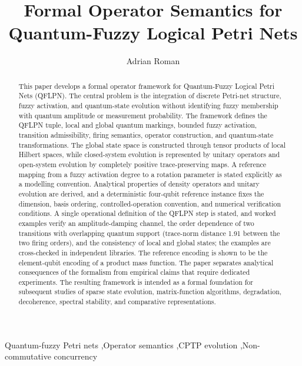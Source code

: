 \documentclass[final,3p,times]{elsarticle}
\begin{document}
\begin{frontmatter}
\title{Formal Operator Semantics for Quantum-Fuzzy Logical Petri Nets}
\date{}
\author[utcn]{Adrian Roman}
\begin{abstract}
This paper develops a formal operator framework for Quantum-Fuzzy Logical Petri Nets (QFLPN). The central problem is the integration of discrete Petri-net structure, fuzzy activation, and quantum-state evolution without identifying fuzzy membership with quantum amplitude or measurement probability. The framework defines the QFLPN tuple, local and global quantum markings, bounded fuzzy activation, transition admissibility, firing semantics, operator construction, and quantum-state transformations. The global state space is constructed through tensor products of local Hilbert spaces, while closed-system evolution is represented by unitary operators and open-system evolution by completely positive trace-preserving maps. A reference mapping from a fuzzy activation degree to a rotation parameter is stated explicitly as a modelling convention. Analytical properties of density operators and unitary evolution are derived, and a deterministic four-qubit reference instance fixes the dimension, basis ordering, controlled-operation convention, and numerical verification conditions. A single operational definition of the QFLPN step is stated, and worked examples verify an amplitude-damping channel, the order dependence of two transitions with overlapping quantum support (trace-norm distance 1.91 between the two firing orders), and the consistency of local and global states; the examples are cross-checked in independent libraries. The reference encoding is shown to be the element-qubit encoding of a product mass function. The paper separates analytical consequences of the formalism from empirical claims that require dedicated experiments. The resulting framework is intended as a formal foundation for subsequent studies of sparse state evolution, matrix-function algorithms, degradation, decoherence, spectral stability, and comparative representations.
\end{abstract}
\begin{keyword}
Quantum-fuzzy Petri nets \sep Operator semantics \sep CPTP evolution \sep Non-commutative concurrency
\end{keyword}
\end{frontmatter}
\end{document}
